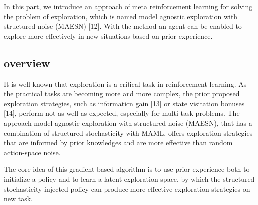 In this part, we introduce an approach of meta reinforcement learning for solving the problem of exploration, which is named model agnostic exploration with structured noise (MAESN) [12]. With the method an agent can be enabled to explore more effectively in new situations based on prior experience.
\subsection{overview}
It is well-known that exploration is a critical task in reinforcement learning. As the practical tasks are becoming more and more complex, the prior proposed exploration strategies, such as information gain [13] or state visitation bonuses [14], perform not as well as expected, especially for multi-task problems. The approach model agnostic exploration with structured noise (MAESN), that has a combination of structured stochasticity with MAML, offers exploration strategies that are informed by prior knowledges and are more effective than random action-space noise.

The core idea of this gradient-based algorithm is to use prior experience both to initialize a policy and to learn a latent exploration space, by which the structured stochasticity injected policy can produce more effective exploration strategies on new task.

